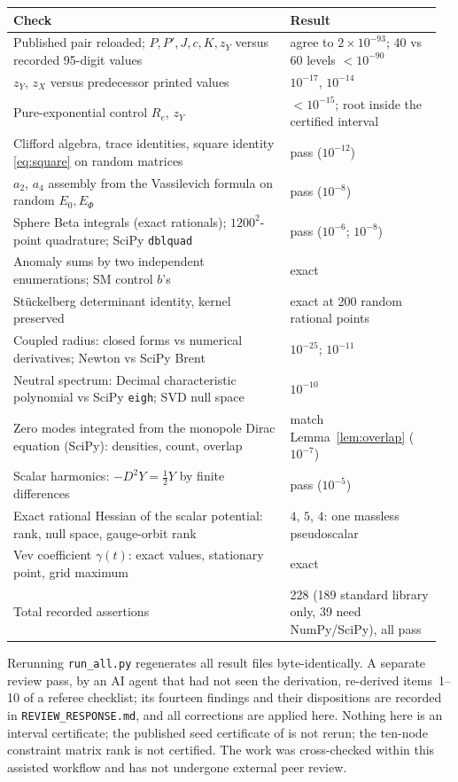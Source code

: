 \documentclass[11pt,letterpaper]{article}
\begin{document}
\begin{center}\small
\begin{tabular}{@{}p{0.62\linewidth}p{0.34\linewidth}@{}}
\toprule
Check & Result\\
\midrule
Published pair reloaded; $P,P',J,c,K,z_Y$ versus recorded 95-digit values & agree to $2\times10^{-93}$; 40 vs 60 levels $<10^{-90}$\\
$z_Y$, $z_X$ versus predecessor printed values & $10^{-17}$, $10^{-14}$\\
Pure-exponential control $R_e$, $z_Y$ & $<10^{-15}$; root inside the certified interval\\
Clifford algebra, trace identities, square identity \eqref{eq:square} on random matrices & pass ($10^{-12}$)\\
$a_2$, $a_4$ assembly from the Vassilevich formula on random $E_0,E_\Phi$ & pass ($10^{-8}$)\\
Sphere Beta integrals (exact rationals); $1200^2$-point quadrature; SciPy \texttt{dblquad} & pass ($10^{-6}$; $10^{-8}$)\\
Anomaly sums by two independent enumerations; SM control $b$'s & exact\\
Stückelberg determinant identity, kernel preserved & exact at 200 random rational points\\
Coupled radius: closed forms vs numerical derivatives; Newton vs SciPy Brent & $10^{-25}$; $10^{-11}$\\
Neutral spectrum: Decimal characteristic polynomial vs SciPy \texttt{eigh}; SVD null space & $10^{-10}$\\
Zero modes integrated from the monopole Dirac equation (SciPy): densities, count, overlap & match Lemma~\ref{lem:overlap} ($10^{-7}$)\\
Scalar harmonics: $-D^2Y=\tfrac12Y$ by finite differences & pass ($10^{-5}$)\\
Exact rational Hessian of the scalar potential: rank, null space, gauge-orbit rank & $4$, $5$, $4$: one massless pseudoscalar\\
Vev coefficient $\gamma(t)$: exact values, stationary point, grid maximum & exact\\
Total recorded assertions & 228 (189 standard library only, 39 need NumPy/SciPy), all pass\\
\bottomrule
\end{tabular}
\end{center}
Rerunning \texttt{run\_all.py} regenerates all result files byte-identically. A separate review pass, by an AI agent that had not seen the derivation, re-derived items~1--10 of a referee checklist; its fourteen findings and their dispositions are recorded in \texttt{REVIEW\_RESPONSE.md}, and all corrections are applied here. Nothing here is an interval certificate; the published seed certificate of \cite{oct22} is not rerun; the ten-node constraint matrix rank is not certified. The work was cross-checked within this assisted workflow and has not undergone external peer review.
\end{document}
